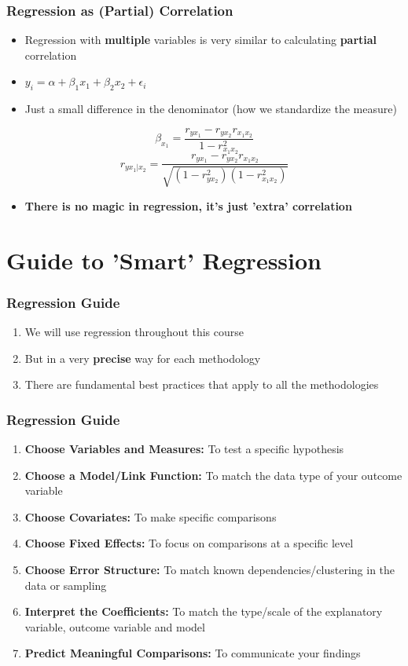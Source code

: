 \documentclass[xcolor=x11names,compress]{beamer}\usepackage[]{graphicx}\usepackage[]{color}
\renewcommand{\(}{\begin{columns}}
\renewcommand{\)}{\end{columns}}
\newcommand{\<}[1]{\begin{column}{#1}}
\renewcommand{\>}{\end{column}}
\begin{document}
\begin{frame}
\frametitle{Regression as (Partial) Correlation}
\begin{itemize}
\item Regression with \textbf{multiple} variables is very similar to calculating \textbf{partial} correlation
\pause
\item $y_i = \alpha + \beta_1 x_1 + \beta_2 x_2 +\epsilon_i$
\pause
\item Just a small difference in the denominator (how we standardize the measure)
\pause
\end{itemize}
$$\beta_{x_1} = \frac{r_{yx_1} - r_{yx_2}r_{x_1x_2}}{1-r^2_{x_1x_2}}$$
$$r_{yx_1|x_2} = \frac{r_{yx_1} - r_{yx_2}r_{x_1x_2}}{\sqrt{(1-r^2_{yx_2})(1-r^2_{x_1x_2})}}$$
\begin{itemize}
\item \textbf{There is no magic in regression, it's just 'extra' correlation}
\end{itemize}
\end{frame}



\section{Guide to 'Smart' Regression}

\begin{frame}
\frametitle{Regression Guide}
\begin{enumerate}
\item We will use regression throughout this course
\pause
\item But in a very \textbf{precise} way for each methodology
\pause
\item There are fundamental best practices that apply to all the methodologies
\end{enumerate}
\end{frame}

\begin{frame}
\frametitle{Regression Guide}
\begin{enumerate}
\item \textbf{Choose Variables and Measures:} To test a specific hypothesis
\pause
\item \textbf{Choose a Model/Link Function:} To match the data type of your outcome variable
\pause
\item \textbf{Choose Covariates:} To make specific comparisons
\pause
\item \textbf{Choose Fixed Effects:} To focus on comparisons at a specific level
\pause
\item \textbf{Choose Error Structure:} To match known dependencies/clustering in the data or sampling
\pause
\item \textbf{Interpret the Coefficients:} To match the type/scale of the explanatory variable, outcome variable and model
\pause
\item \textbf{Predict Meaningful Comparisons:} To communicate your findings
\end{enumerate}
\end{frame}
\end{document}
